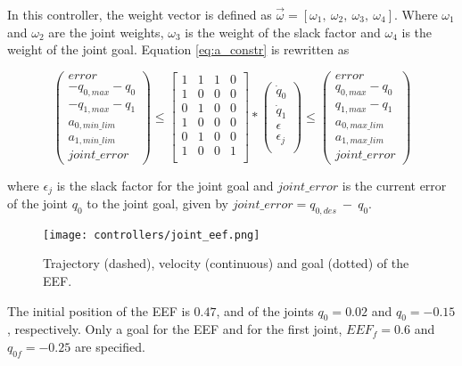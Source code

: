 In this controller, the weight vector is defined as $\vec{\omega} = [ \omega_{1},\ \omega_{2},\ \omega_{3},\ \omega_{4} ]$. Where $\omega_{1}$ and $\omega_{2}$ are the joint weights, $\omega_{3}$ is the weight of the slack factor and $\omega_{4}$ is the weight of the joint goal. Equation \ref{eq:a_constr} is rewritten as

$$
\left( \begin{array}{c}
error \\
-q_{0,max} - q_{0} \\
-q_{1,max} - q_{1} \\
a_{0,min\_lim} \\
a_{1,min\_lim} \\
joint\_error
\end{array}
\right)	\leq 
\left[ \begin{array}{cccc}
1 & 1 & 1 & 0 \\
1 & 0 & 0 & 0 \\
0 & 1 & 0 & 0 \\
1 & 0 & 0 & 0 \\
0 & 1 & 0 & 0 \\
1 & 0 & 0 & 1 \\
\end{array}
\right] *
\left( \begin{array}{c}
\dot{q}_{0} \\
\dot{q}_{1} \\
\epsilon \\
\epsilon_j \\
\end{array}
\right) 
\leq \left( \begin{array}{c}
error \\
q_{0,max} - q_{0} \\
q_{1,max} - q_{1} \\
a_{0,max\_lim} \\
a_{1,max\_lim} \\
joint\_error
\end{array}
\right)
$$

where $\epsilon_j$ is the slack factor for the joint goal and $joint\_error$ is the current error of the joint $q_{0}$ to the joint goal, given by $joint\_error = q_{0,des}\ -\ q_{0}$.

\begin{figure}[H]
	\centering
	\texttt{[image: controllers/joint\_eef.png]}
	\vspace{-10pt}
	\caption[Joint and EEF goal: EEF trajectory]{Trajectory (dashed), velocity (continuous) and goal (dotted) of the EEF.}
	\vspace{-15pt}
	\label{fig:joint_eef}
\end{figure}
The initial position of the EEF is $0.47$, and of the joints $q_{0}= 0.02$ and $q_{0}= -0.15$, respectively. Only a goal for the EEF and for the first joint, $EEF_{f}= 0.6$ and $q_{0f} = -0.25$ are specified.

